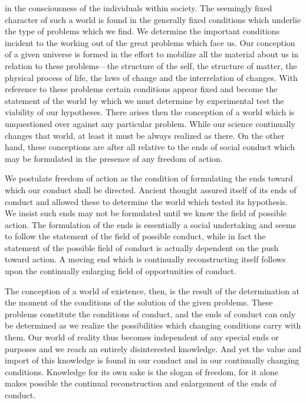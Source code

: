 \documentclass[12pt]{article}
\begin{document}
in the consciousness of the individuals within society.
The seemingly fixed character of such a world is found
in the generally fixed conditions which underlie the
type of problems which we find. We determine the
important conditions incident to the working out of
the great problems which face us. Our conception of a
given universe is formed in the effort to mobilize all
the material about us in relation to these problems—the
structure of the self, the structure of matter, the
physical process of life, the laws of change and the
interrelation of changes. With reference to these
problems certain conditions appear fixed and become
the statement of the world by which we must determine
by experimental test the viability of our hypotheses.
There arises then the conception of a world
which is unquestioned over against any particular
problem. While our science continually changes that
world, at least it must be always realized as there.
On the other hand, these conceptions are after all
relative to the ends of social conduct which may
be formulated in the presence of any freedom of
action.


We postulate freedom of action as the condition of
formulating the ends toward which our conduct shall
be directed. Ancient thought assured itself of its ends
of conduct and allowed these to determine the world
which tested its hypothesis. We insist such ends may
not be formulated until we know the field of possible
action. The formulation of the ends is essentially a
social undertaking and seems to follow the statement
of the field of possible conduct, while in fact the statement
of the possible field of conduct is actually dependent
on the push toward action. A moving end
which is continually reconstructing itself follows upon
the continually enlarging field of opportunities of
conduct.


The conception of a world of existence, then, is the
result of the determination at the moment of the conditions
of the solution of the given problems. These
problems constitute the conditions of conduct, and the
ends of conduct can only be determined as we realize
the possibilities which changing conditions carry with
them. Our world of reality thus becomes independent
of any special ends or purposes and we reach an entirely
disinterested knowledge. And yet the value and
import of this knowledge is found in our conduct and
in our continually changing conditions. Knowledge
for its own sake is the slogan of freedom, for it alone
makes possible the continual reconstruction and enlargement
of the ends of conduct.
\end{document}
